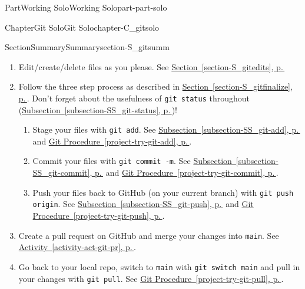 \documentclass[twoside,10pt,]{book}
\newcommand{\xreffont}{\relax}
\newcommand{\mono}[1]{\texttt{#1}}
\begin{document}
\begin{partptx}{Part}{Working Solo}{}{Working Solo}{}{}{part-part-solo}
\begin{chapterptx}{Chapter}{Git Solo}{}{Git Solo}{}{}{chapter-C_gitsolo}
\begin{sectionptx}{Section}{Summary}{}{Summary}{}{}{section-S_gitsumm}
\begin{enumerate}
\item{}Edit\slash{}create\slash{}delete files as you please. See \hyperref[section-S_gitedits]{Section~{\xreffont\ref{section-S_gitedits}}, p.\,\pageref{section-S_gitedits}}%
\item{}Follow the three step process as described in \hyperref[section-S_gitfinalize]{Section~{\xreffont\ref{section-S_gitfinalize}}, p.\,\pageref{section-S_gitfinalize}}. Don't forget about the usefulness of \mono{git status} throughout (\hyperref[subsection-SS_git-status]{Subsection~{\xreffont\ref{subsection-SS_git-status}}, p.\,\pageref{subsection-SS_git-status}})!%
\begin{enumerate}
\item{}Stage your files with \mono{git add}. See \hyperref[subsection-SS_git-add]{Subsection~{\xreffont\ref{subsection-SS_git-add}}, p.\,\pageref{subsection-SS_git-add}} and \hyperref[project-try-git-add]{Git Procedure~{\xreffont\ref{project-try-git-add}}, p.\,\pageref{project-try-git-add}}.%
\item{}Commit your files with \mono{git commit -m}. See \hyperref[subsection-SS_git-commit]{Subsection~{\xreffont\ref{subsection-SS_git-commit}}, p.\,\pageref{subsection-SS_git-commit}} and \hyperref[project-try-git-commit]{Git Procedure~{\xreffont\ref{project-try-git-commit}}, p.\,\pageref{project-try-git-commit}}.%
\item{}Push your files back to GitHub (on your current branch) with \mono{git push origin}. See \hyperref[subsection-SS_git-push]{Subsection~{\xreffont\ref{subsection-SS_git-push}}, p.\,\pageref{subsection-SS_git-push}} and \hyperref[project-try-git-push]{Git Procedure~{\xreffont\ref{project-try-git-push}}, p.\,\pageref{project-try-git-push}}.%
\end{enumerate}
%
\item{}Create a pull request on GitHub and merge your changes into \mono{main}. See \hyperref[activity-act-git-pr]{Activity~{\xreffont\ref{activity-act-git-pr}}, p.\,\pageref{activity-act-git-pr}}.%
\item{}Go back to your local repo, switch to \mono{main} with \mono{git switch main} and pull in your changes with \mono{git pull}. See \hyperref[project-try-git-pull]{Git Procedure~{\xreffont\ref{project-try-git-pull}}, p.\,\pageref{project-try-git-pull}}.%
\end{enumerate}
%
\end{sectionptx}
%
%
\typeout{************************************************}

\end{chapterptx}
\end{partptx}
\end{document}
